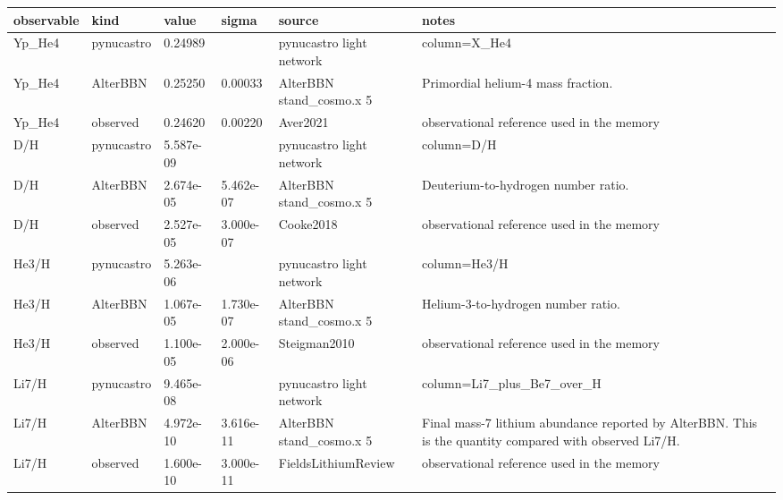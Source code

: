 \begin{tabular}{llllll}
\toprule
observable & kind & value & sigma & source & notes \\
\midrule
Yp_He4 & pynucastro & 0.24989 &  & pynucastro light network & column=X_He4 \\
Yp_He4 & AlterBBN & 0.25250 & 0.00033 & AlterBBN stand_cosmo.x 5 & Primordial helium-4 mass fraction. \\
Yp_He4 & observed & 0.24620 & 0.00220 & Aver2021 & observational reference used in the memory \\
D/H & pynucastro & 5.587e-09 &  & pynucastro light network & column=D/H \\
D/H & AlterBBN & 2.674e-05 & 5.462e-07 & AlterBBN stand_cosmo.x 5 & Deuterium-to-hydrogen number ratio. \\
D/H & observed & 2.527e-05 & 3.000e-07 & Cooke2018 & observational reference used in the memory \\
He3/H & pynucastro & 5.263e-06 &  & pynucastro light network & column=He3/H \\
He3/H & AlterBBN & 1.067e-05 & 1.730e-07 & AlterBBN stand_cosmo.x 5 & Helium-3-to-hydrogen number ratio. \\
He3/H & observed & 1.100e-05 & 2.000e-06 & Steigman2010 & observational reference used in the memory \\
Li7/H & pynucastro & 9.465e-08 &  & pynucastro light network & column=Li7_plus_Be7_over_H \\
Li7/H & AlterBBN & 4.972e-10 & 3.616e-11 & AlterBBN stand_cosmo.x 5 & Final mass-7 lithium abundance reported by AlterBBN. This is the quantity compared with observed Li7/H. \\
Li7/H & observed & 1.600e-10 & 3.000e-11 & FieldsLithiumReview & observational reference used in the memory \\
\bottomrule
\end{tabular}
